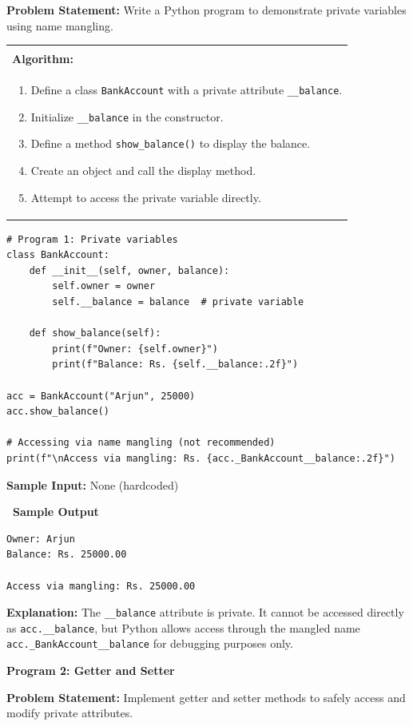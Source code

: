 \documentclass[12pt,a4paper]{article}
\makeatletter
\newcommand{\outhead}{\noindent\colorbox{cmrgreen!25}%
  {\textbf{\small\color{cmrdark}~Sample Output~}}\par\vspace{-1pt}}
\newenvironment{algobox}{%
  \par\vspace{4pt}%
  \noindent\begin{tabular}{@{}p{\linewidth}@{}}%
  \hline\\[-8pt]%
  \textbf{\color{blue!60!black}\small Algorithm:}\\[2pt]%
}{%
  \\[-4pt]\hline%
  \end{tabular}\par\vspace{4pt}%
}
\makeatother
\begin{document}
\textbf{Problem Statement:}
Write a Python program to demonstrate private variables using name mangling.

\begin{algobox}
\begin{enumerate}[label=Step \arabic*:]
  \item Define a class \texttt{BankAccount} with a private attribute \texttt{\_\_balance}.
  \item Initialize \texttt{\_\_balance} in the constructor.
  \item Define a method \texttt{show\_balance()} to display the balance.
  \item Create an object and call the display method.
  \item Attempt to access the private variable directly.
\end{enumerate}
\end{algobox}

\begin{lstlisting}
# Program 1: Private variables
class BankAccount:
    def __init__(self, owner, balance):
        self.owner = owner
        self.__balance = balance  # private variable

    def show_balance(self):
        print(f"Owner: {self.owner}")
        print(f"Balance: Rs. {self.__balance:.2f}")

acc = BankAccount("Arjun", 25000)
acc.show_balance()

# Accessing via name mangling (not recommended)
print(f"\nAccess via mangling: Rs. {acc._BankAccount__balance:.2f}")
\end{lstlisting}

\textbf{Sample Input:} None (hardcoded)

\outhead
\begin{lstlisting}[style=outputstyle]
Owner: Arjun
Balance: Rs. 25000.00

Access via mangling: Rs. 25000.00
\end{lstlisting}

\textbf{Explanation:} The \texttt{\_\_balance} attribute is private. It cannot be accessed directly as \texttt{acc.\_\_balance}, but Python allows access through the mangled name \texttt{acc.\_BankAccount\_\_balance} for debugging purposes only.

\vspace{0.5cm}

\textbf{Program 2: Getter and Setter}

\textbf{Problem Statement:}
Implement getter and setter methods to safely access and modify private attributes.
\end{document}

